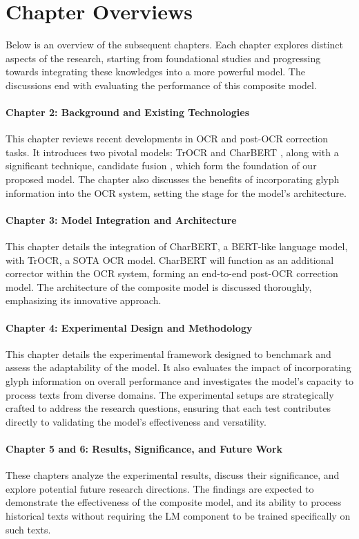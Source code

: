 \section{Chapter Overviews}
\label{sec:1_chapter_overviews}
Below is an overview of the subsequent chapters. Each chapter explores distinct aspects of the research, starting from foundational studies and progressing towards integrating these knowledges into a more powerful model. The discussions end with evaluating the performance of this composite model.

\paragraph*{Chapter 2: Background and Existing Technologies}
This chapter reviews recent developments in OCR and post-OCR correction tasks. It introduces two pivotal models: TrOCR \citep{li2023trocr} and CharBERT \citep{ma-etal-2020-charbert}, along with a significant technique, candidate fusion \citep{kang2021candidate}, which form the foundation of our proposed model. The chapter also discusses the benefits of incorporating glyph information into the OCR system, setting the stage for the model's architecture.

\paragraph*{Chapter 3: Model Integration and Architecture}
This chapter details the integration of CharBERT, a BERT-like language model, with TrOCR, a SOTA OCR model. CharBERT will function as an additional corrector within the OCR system, forming an end-to-end post-OCR correction model. The architecture of the composite model is discussed thoroughly, emphasizing its innovative approach.

\paragraph*{Chapter 4: Experimental Design and Methodology}
This chapter details the experimental framework designed to benchmark and assess the adaptability of the model. It also evaluates the impact of incorporating glyph information on overall performance and investigates the model's capacity to process texts from diverse domains. The experimental setups are strategically crafted to address the research questions, ensuring that each test contributes directly to validating the model's effectiveness and versatility.

\paragraph*{Chapter 5 and 6: Results, Significance, and Future Work}
These chapters analyze the experimental results, discuss their significance, and explore potential future research directions. The findings are expected to demonstrate the effectiveness of the composite model, and its ability to process historical texts without requiring the LM component to be trained specifically on such texts.

